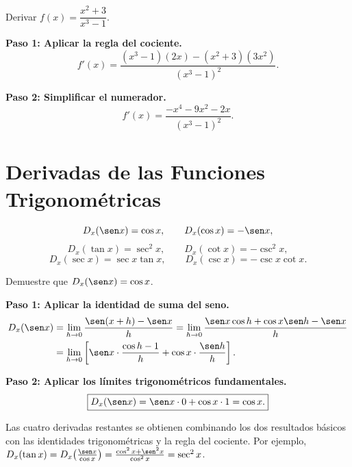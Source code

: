 \begin{example}
Derivar $f(x) = \dfrac{x^2+3}{x^3-1}$.

\begin{myproof}

\textbf{Paso 1: Aplicar la regla del cociente.}
\[
f'(x) = \frac{(x^3-1)(2x)-(x^2+3)(3x^2)}{(x^3-1)^2}.
\]

\textbf{Paso 2: Simplificar el numerador.}
\[
\boxed{f'(x) = \frac{-x^4-9x^2-2x}{(x^3-1)^2}.}
\]
\end{myproof}
\end{example}

\section{Derivadas de las Funciones Trigonométricas}

\begin{theorem}
\[
D_x(\sen x) = \cos x, \qquad D_x(\cos x) = -\sen x,
\]
\[
D_x(\tan x) = \sec^2 x, \qquad D_x(\cot x) = -\csc^2 x,
\]
\[
D_x(\sec x) = \sec x\tan x, \qquad D_x(\csc x) = -\csc x\cot x.
\]
\end{theorem}

\begin{example}
Demuestre que $D_x(\sen x) = \cos x$.

\begin{myproof}

\textbf{Paso 1: Aplicar la identidad de suma del seno.}
\begin{align*}
D_x(\sen x)
&= \lim_{h\to 0}\frac{\sen(x+h)-\sen x}{h}
= \lim_{h\to 0}\frac{\sen x\cos h+\cos x\sen h-\sen x}{h}\\
&= \lim_{h\to 0}\left[\sen x\cdot\frac{\cos h-1}{h}
  +\cos x\cdot\frac{\sen h}{h}\right].
\end{align*}

\textbf{Paso 2: Aplicar los límites trigonométricos fundamentales.}
\[
\boxed{D_x(\sen x) = \sen x\cdot 0 + \cos x\cdot 1 = \cos x.}
\]
\end{myproof}
\end{example}

\begin{rem}
Las cuatro derivadas restantes se obtienen combinando los dos resultados
básicos con las identidades trigonométricas y la regla del cociente.
Por ejemplo, $D_x(\tan x) = D_x\!\left(\frac{\sen x}{\cos x}\right)
= \frac{\cos^2 x+\sen^2 x}{\cos^2 x} = \sec^2 x$.
\end{rem}

